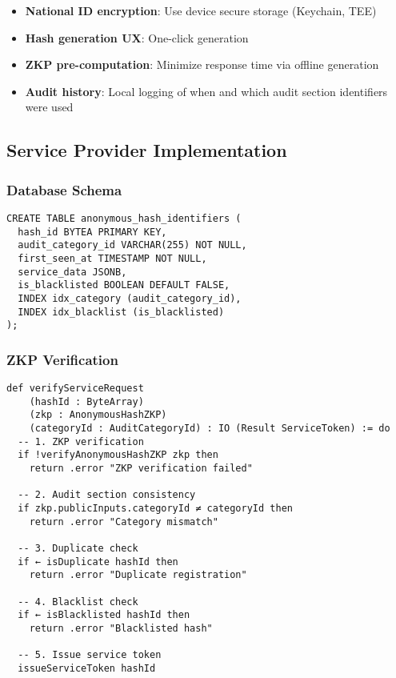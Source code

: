 \begin{itemize}
  \item \textbf{National ID encryption}: Use device secure storage (Keychain, TEE)
  \item \textbf{Hash generation UX}: One-click generation
  \item \textbf{ZKP pre-computation}: Minimize response time via offline generation
  \item \textbf{Audit history}: Local logging of when and which audit section identifiers were used
\end{itemize}

\subsection{Service Provider Implementation}

\subsubsection{Database Schema}

\begin{verbatim}
CREATE TABLE anonymous_hash_identifiers (
  hash_id BYTEA PRIMARY KEY,
  audit_category_id VARCHAR(255) NOT NULL,
  first_seen_at TIMESTAMP NOT NULL,
  service_data JSONB,
  is_blacklisted BOOLEAN DEFAULT FALSE,
  INDEX idx_category (audit_category_id),
  INDEX idx_blacklist (is_blacklisted)
);
\end{verbatim}

\subsubsection{ZKP Verification}

\begin{verbatim}
def verifyServiceRequest
    (hashId : ByteArray)
    (zkp : AnonymousHashZKP)
    (categoryId : AuditCategoryId) : IO (Result ServiceToken) := do
  -- 1. ZKP verification
  if !verifyAnonymousHashZKP zkp then
    return .error "ZKP verification failed"

  -- 2. Audit section consistency
  if zkp.publicInputs.categoryId ≠ categoryId then
    return .error "Category mismatch"

  -- 3. Duplicate check
  if ← isDuplicate hashId then
    return .error "Duplicate registration"

  -- 4. Blacklist check
  if ← isBlacklisted hashId then
    return .error "Blacklisted hash"

  -- 5. Issue service token
  issueServiceToken hashId
\end{verbatim}

